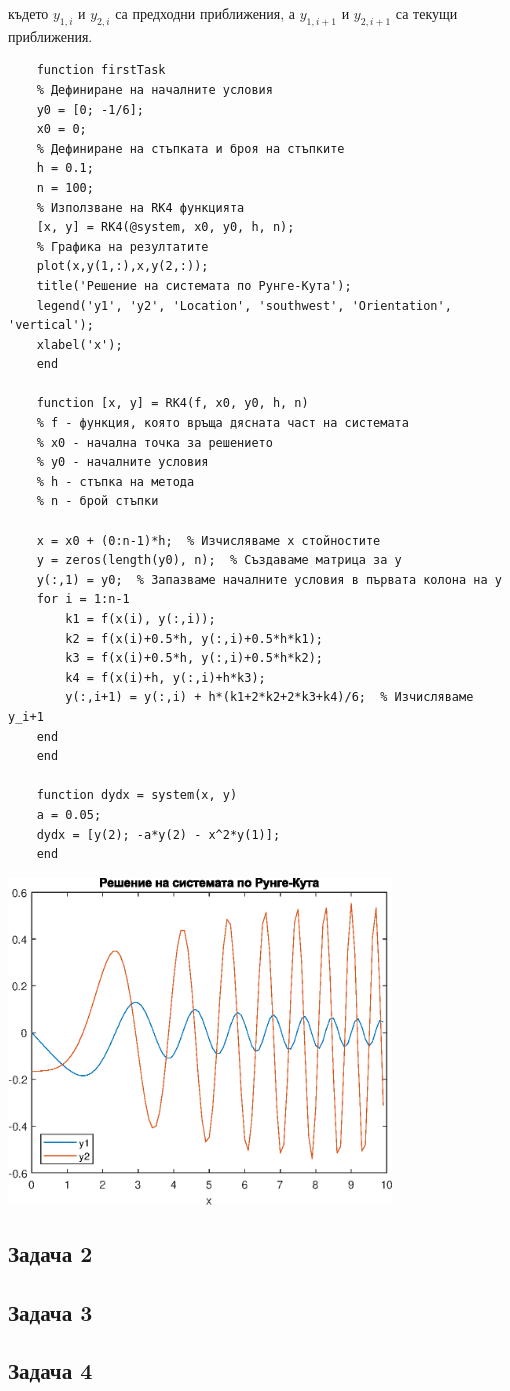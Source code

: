 \documentclass[a4paper,fleqn,12pt]{article}
\begin{document}
където $y_{1,i}$ и $y_{2,i}$ са предходни приближения, а $y_{1,i+1}$ и $y_{2,i+1}$ са текущи приближения. \\
	\newpage
	\begin{verbatim}
	function firstTask
	% Дефиниране на началните условия
	y0 = [0; -1/6];
	x0 = 0;
	% Дефиниране на стъпката и броя на стъпките
	h = 0.1;
	n = 100;
	% Използване на RK4 функцията
	[x, y] = RK4(@system, x0, y0, h, n);
	% Графика на резултатите
	plot(x,y(1,:),x,y(2,:));
	title('Решение на системата по Рунге-Кута');
	legend('y1', 'y2', 'Location', 'southwest', 'Orientation', 'vertical');
	xlabel('x');
	end
	
	function [x, y] = RK4(f, x0, y0, h, n)
	% f - функция, която връща дясната част на системата
	% x0 - начална точка за решението
	% y0 - началните условия
	% h - стъпка на метода
	% n - брой стъпки
	
	x = x0 + (0:n-1)*h;  % Изчисляваме x стойностите
	y = zeros(length(y0), n);  % Създаваме матрица за y
	y(:,1) = y0;  % Запазваме началните условия в първата колона на y
	for i = 1:n-1
	    k1 = f(x(i), y(:,i));
	    k2 = f(x(i)+0.5*h, y(:,i)+0.5*h*k1);
	    k3 = f(x(i)+0.5*h, y(:,i)+0.5*h*k2);
	    k4 = f(x(i)+h, y(:,i)+h*k3);
	    y(:,i+1) = y(:,i) + h*(k1+2*k2+2*k3+k4)/6;  % Изчисляваме y_i+1
	end
	end
	
	function dydx = system(x, y)
	a = 0.05;
	dydx = [y(2); -a*y(2) - x^2*y(1)];
	end
	\end{verbatim}

\includegraphics [width=4in]{firstTask_01.eps}

\newpage
\subsection{Задача 2}

\newpage
\subsection{Задача 3}

\newpage
\subsection{Задача 4}
\end{document}
